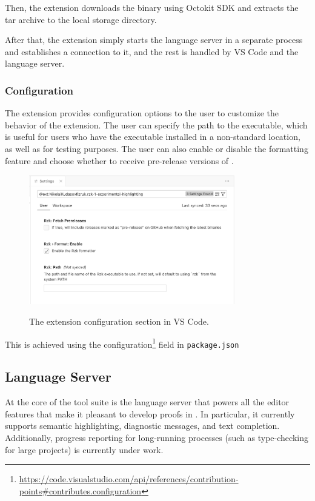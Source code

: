 Then, the extension downloads the binary using Octokit SDK and extracts the tar archive to the local storage directory.

After that, the extension simply starts the language server in a separate process and establishes a connection to it,
and the rest is handled by VS Code and the language server.

\subsubsection{Configuration}

The extension provides configuration options to the user to customize the behavior of the extension.
The user can specify the path to the \Rzk{} executable, which is useful for users who have the executable installed in a non-standard location, as well as for testing purposes.
The user can also enable or disable the formatting feature and choose whether to receive pre-release versions of \Rzk{}.

\begin{figure}
  \centering
  \includegraphics[width=0.8\textwidth]{figs/rzk-vscode-settings.png}
  \label{figure:vscode-settings}
  \caption{The extension configuration section in VS Code.}
\end{figure}

This is achieved using the configuration\footnote{
  \url{https://code.visualstudio.com/api/references/contribution-points\#contributes.configuration}}
field in \texttt{package.json}

\subsection{\Rzk{} Language Server}

At the core of the \Rzk{} tool suite is the language server that powers all the editor features that make it pleasant to develop proofs in \Rzk{}. In particular, it currently supports semantic highlighting, diagnostic messages, and text completion. Additionally, progress reporting for long-running processes (such as type-checking for large projects) is currently under work.

